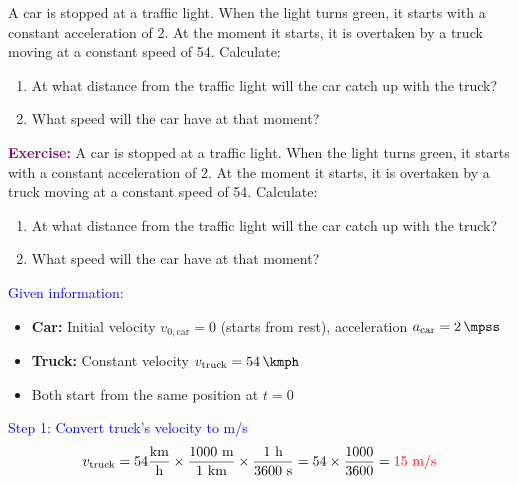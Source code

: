 \begin{exercise}
    A car is stopped at a traffic light.
    When the light turns green, it starts with a constant acceleration of \qty{2}{\mpss}.
    At the moment it starts, it is overtaken by a truck moving at a constant speed of \qty{54}{\kmph}.
    Calculate:

    \begin{enumerate}[label=\letraminuscula]
    \item At what distance from the traffic light will the car catch up with the truck?
    \item What speed will the car have at that moment?
    \end{enumerate}
    \begin{solu}
        \textbf{\textcolor{purple}{Exercise:}} A car is stopped at a traffic light.
        When the light turns green, it starts with a constant acceleration of \qty{2}{\mpss}.
        At the moment it starts, it is overtaken by a truck moving at a constant speed of \qty{54}{\kmph}.
        Calculate:

        \begin{enumerate}[label=\letraminuscula]
    \item At what distance from the traffic light will the car catch up with the truck?
    \item What speed will the car have at that moment?
        \end{enumerate}

        \vspace{0.3cm}

        \textcolor{blue}{Given information:}
        \begin{itemize}
            \item \textbf{Car:} Initial velocity $v_{0,\text{car}} = 0$ (starts from rest), acceleration $a_{\text{car}} = \qty{2}{\mpss}$
            \item \textbf{Truck:} Constant velocity $v_{\text{truck}} = \qty{54}{\kmph}$
            \item Both start from the same position at $t = 0$
        \end{itemize}

        \textcolor{blue}{Step 1: Convert truck's velocity to m/s}
        \[
            v_{\text{truck}} = 54 \frac{\text{km}}{\text{h}} \times \frac{1000 \text{ m}}{1 \text{ km}} \times \frac{1 \text{ h}}{3600 \text{ s}} = 54 \times \frac{1000}{3600} = \textcolor{red}{15 \text{ m/s}}
        \]


\end{solu}
\end{exercise}
